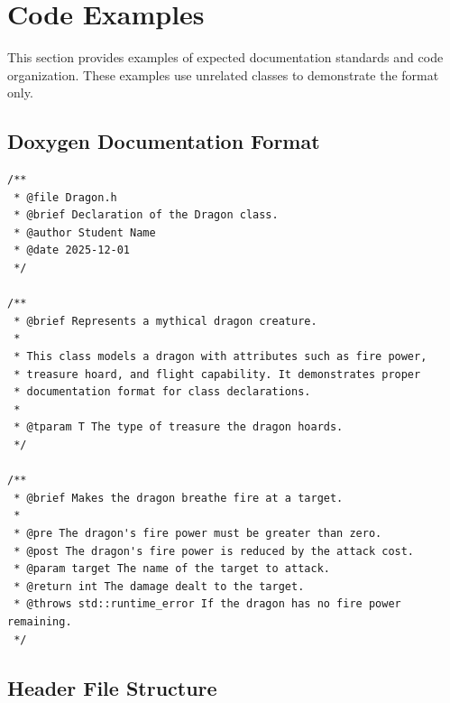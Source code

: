 
\section{Code Examples}

This section provides examples of expected documentation standards and code organization. These examples use unrelated classes to demonstrate the format only.

\subsection{Doxygen Documentation Format}

\begin{lstlisting}[style=cpp]
/**
 * @file Dragon.h
 * @brief Declaration of the Dragon class.
 * @author Student Name
 * @date 2025-12-01
 */

/**
 * @brief Represents a mythical dragon creature.
 *
 * This class models a dragon with attributes such as fire power,
 * treasure hoard, and flight capability. It demonstrates proper
 * documentation format for class declarations.
 *
 * @tparam T The type of treasure the dragon hoards.
 */

/**
 * @brief Makes the dragon breathe fire at a target.
 *
 * @pre The dragon's fire power must be greater than zero.
 * @post The dragon's fire power is reduced by the attack cost.
 * @param target The name of the target to attack.
 * @return int The damage dealt to the target.
 * @throws std::runtime_error If the dragon has no fire power remaining.
 */
\end{lstlisting}

\subsection{Header File Structure}

